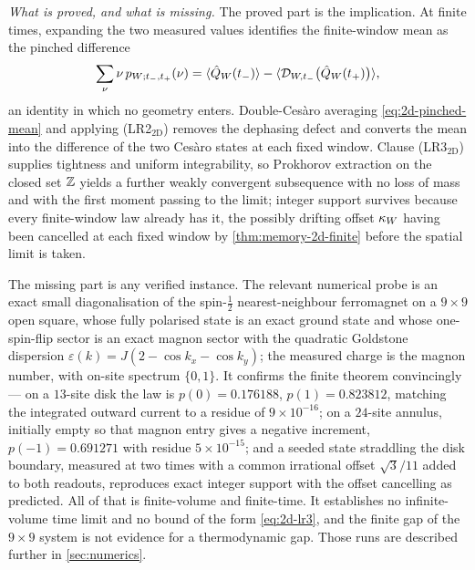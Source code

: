 \emph{What is proved, and what is missing.} The proved part is the implication.
At finite times, expanding the two measured values identifies the
finite-window mean as the pinched difference
\begin{equation}
  \sum_\nu\nu\,p_{W;t_-,t_+}(\nu)
   =\langle \hat{Q}_W(t_-)\rangle
    -\langle \mathcal{D}_{W,t_-}\bigl(\hat{Q}_W(t_+)\bigr)\rangle,
  \label{eq:2d-pinched-mean}
\end{equation}
an identity in which no geometry enters. Double-Ces\`aro averaging
\eqref{eq:2d-pinched-mean} and applying (LR2$_{\mathrm{2D}}$) removes the
dephasing defect and converts the mean into the difference of the two Ces\`aro
states at each fixed window. Clause (LR3$_{\mathrm{2D}}$) supplies tightness
and uniform integrability, so Prokhorov extraction on the closed set $\mathbb{Z}$
yields a further weakly convergent subsequence with no loss of mass and with
the first moment passing to the limit; integer support survives because every
finite-window law already has it, the possibly drifting offset $\kappa_W$
having been cancelled at each fixed window by
\cref{thm:memory-2d-finite} before the spatial limit is taken.

The missing part is any verified instance. The relevant numerical probe is an
exact small diagonalisation of the spin-$\tfrac12$ nearest-neighbour
ferromagnet on a $9\times9$ open square, whose fully polarised state is an
exact ground state and whose one-spin-flip sector is an exact magnon sector
with the quadratic Goldstone dispersion
$\varepsilon(k)=J(2-\cos k_x-\cos k_y)$; the measured charge is the magnon
number, with on-site spectrum $\{0,1\}$. It confirms the finite theorem
convincingly --- on a $13$-site disk the law is
$p(0)=0.176188$, $p(1)=0.823812$, matching the integrated outward current to a
residue of $9\times10^{-16}$; on a $24$-site annulus, initially empty so that
magnon entry gives a negative increment, $p(-1)=0.691271$ with residue
$5\times10^{-15}$; and a seeded state straddling the disk boundary, measured at
two times with a common irrational offset $\sqrt3/11$ added to both readouts,
reproduces exact integer support with the offset cancelling as predicted. All
of that is finite-volume and finite-time. It establishes no infinite-volume
time limit and no bound of the form \eqref{eq:2d-lr3}, and the finite gap of
the $9\times9$ system is not evidence for a thermodynamic gap. Those runs are
described further in \cref{sec:numerics}.

